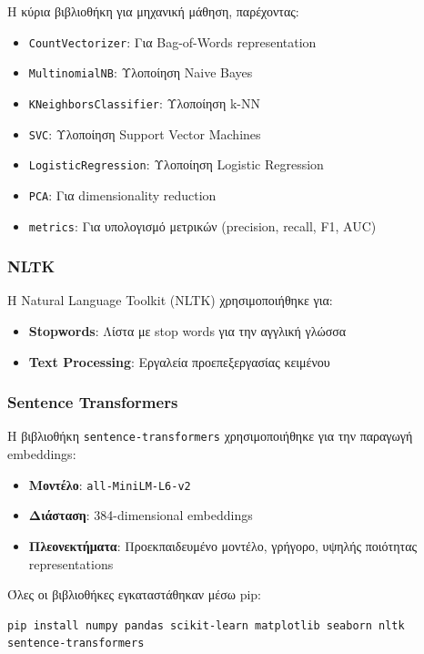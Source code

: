 \documentclass[12pt,a4paper,twoside]{book}
\begin{document}
Η κύρια βιβλιοθήκη για μηχανική μάθηση, παρέχοντας:

\begin{itemize}
    \item \texttt{CountVectorizer}: Για Bag-of-Words representation
    \item \texttt{MultinomialNB}: Υλοποίηση Naive Bayes
    \item \texttt{KNeighborsClassifier}: Υλοποίηση k-NN
    \item \texttt{SVC}: Υλοποίηση Support Vector Machines
    \item \texttt{LogisticRegression}: Υλοποίηση Logistic Regression
    \item \texttt{PCA}: Για dimensionality reduction
    \item \texttt{metrics}: Για υπολογισμό μετρικών (precision, recall, F1, AUC)
\end{itemize}

\subsubsection{NLTK}

Η Natural Language Toolkit (NLTK) χρησιμοποιήθηκε για:

\begin{itemize}
    \item \textbf{Stopwords}: Λίστα με stop words για την αγγλική γλώσσα
    \item \textbf{Text Processing}: Εργαλεία προεπεξεργασίας κειμένου
\end{itemize}

\subsubsection{Sentence Transformers}

Η βιβλιοθήκη \texttt{sentence-transformers} χρησιμοποιήθηκε για την παραγωγή embeddings:

\begin{itemize}
    \item \textbf{Μοντέλο}: \texttt{all-MiniLM-L6-v2}
    \item \textbf{Διάσταση}: 384-dimensional embeddings
    \item \textbf{Πλεονεκτήματα}: Προεκπαιδευμένο μοντέλο, γρήγορο, υψηλής ποιότητας representations
\end{itemize}

Όλες οι βιβλιοθήκες εγκαταστάθηκαν μέσω pip:

\begin{tcolorbox}[myCustomStyle={Library Installation}]
    \begin{lstlisting}[style=myPythonStyle]
pip install numpy pandas scikit-learn matplotlib seaborn nltk sentence-transformers
\end{lstlisting}
\end{tcolorbox}
\end{document}
